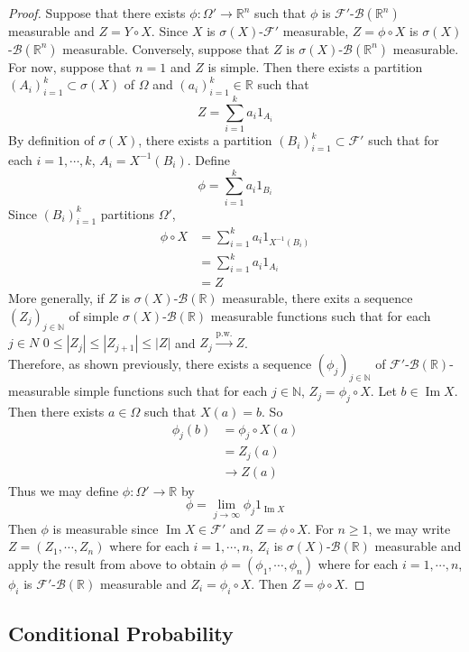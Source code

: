 \documentclass[12pt]{amsart}
\theoremstyle{definition}
\newcommand{\sig}{\sigma}
\newcommand{\Om}{\Omega}
\newcommand{\N}{\mathbb{N}}
\newcommand{\R}{\mathbb{R}}
\newcommand{\MB}{\mathcal{B}}
\newcommand{\MF}{\mathcal{F}}
\newcommand{\convt}[1]{\xrightarrow{\text{#1}}}
\DeclareMathOperator{\Img}{Im}
\begin{document}
	\begin{proof}
	Suppose that there exists $\phi:\Om' \rightarrow \R^n$ such that $\phi$ is $\MF'$-$\MB(\R^n)$ measurable and $Z = Y \circ X$. Since $X$ is $\sig(X)$-$\MF'$ measurable, $Z = \phi \circ X$ is $\sig(X)$-$\MB(\R^n)$ measurable.
	Conversely, suppose that $Z$ is $\sig(X)$-$\MB(\R^n)$ measurable. For now, suppose that $n =1$ and $Z$ is simple. Then there exists a partition $(A_i)_{i=1}^k \subset \sig(X)$ of $\Om$ and $(a_i)_{i =1}^k \in \R$ such that 
	$$Z = \sum_{i=1}^k a_i 1_{A_i}$$ 
	By definition of $\sig(X)$, there exists a partition $(B_i)_{i=1}^k \subset \MF'$ such that for each $i = 1, \cdots, k$, $A_i = X^{-1}(B_i)$. Define 
	$$\phi = \sum_{i=1}^k a_i 1_{B_i}$$ 
	Since $(B_i)_{i=1}^k$ partitions $\Om'$, 
	\begin{align*}
	\phi \circ X 
	&= \sum_{i=1}^k a_i 1_{X^{-1}(B_i)} \\
	&= \sum_{i=1}^k a_i 1_{A_i} \\
	&= Z
	\end{align*}
	More generally, if $Z$ is $\sig(X)$-$\MB(\R)$ measurable, there exits a sequence $(Z_j)_{j \in \N}$ of simple $\sig(X)$-$\MB(\R)$ measurable functions such that for each $j \in N$ $0 \leq |Z_j| \leq |Z_{j+1}| \leq |Z| $ and $Z_j \convt{p.w.} Z$. \vspace{0cm} \\ Therefore, as shown previously, there exists a sequence $(\phi_j)_{j \in \N}$ of $\MF'$-$\MB(\R)$-measurable simple functions such that for each $j \in \N$, $Z_j = \phi_j \circ X$. Let $b \in \Img X$. Then there exists $a \in \Om$ such that $X(a) = b$. So 
	\begin{align*}
	\phi_j(b) 
	&= \phi_j \circ X(a) \\
	&= Z_j(a) \\
	& \rightarrow Z(a) 
	\end{align*}
	Thus we may define $\phi:\Om' \rightarrow \R$ by $$\phi = \lim_{j \rightarrow \infty} \phi_j 1_{\Img X}$$
	Then $\phi$ is measurable since $\Img X \in \MF'$ and $Z = \phi \circ X$. For $n \geq 1$, we may write $Z = (Z_1, \cdots, Z_n)$ where for each $i =1, \cdots, n$, $Z_i$ is $\sig(X)$-$\MB(\R)$ measurable and apply the result from above to obtain $ \phi = (\phi_1, \cdots, \phi_n)$ where for each $i =1, \cdots, n$, $\phi_i$ is $\MF'$-$\MB(\R)$ measurable and $Z_i = \phi_i \circ X$. Then $Z = \phi \circ X$.
	\end{proof}		
	
	\subsection{Conditional Probability}
	
\end{document}
